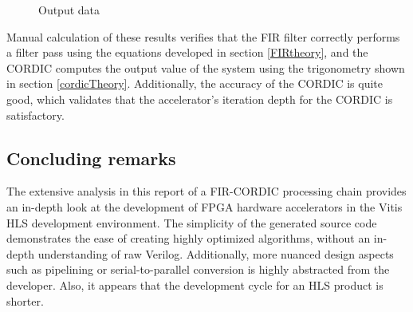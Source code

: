 \documentclass[11pt]{report}
\begin{document}
\begin{figure}[h!]
 	\begin{center}
 		\fboxsep=0mm
 		\caption{Output data}
 		\label{fig:outputResults}
 	\end{center}
 \end{figure}
 \FloatBarrier
 
 Manual calculation of these results verifies that the FIR filter correctly performs a filter pass using the equations developed in section \ref{FIRtheory}, and the CORDIC computes the output value of the system using the trigonometry shown in section \ref{cordicTheory}. Additionally, the accuracy of the CORDIC is quite good, which validates that the accelerator's iteration depth for the CORDIC is satisfactory.
 
 
 \subsection{Concluding remarks}
 
 The extensive analysis in this report of a FIR-CORDIC processing chain provides an in-depth look at the development of FPGA hardware accelerators in the Vitis HLS development environment. The simplicity of the generated source code demonstrates the ease of creating highly optimized algorithms, without an in-depth understanding of raw Verilog. Additionally, more nuanced design aspects such as pipelining or serial-to-parallel conversion is highly abstracted from the developer. Also, it appears that the development cycle for an HLS product is shorter.
 
\end{document}
